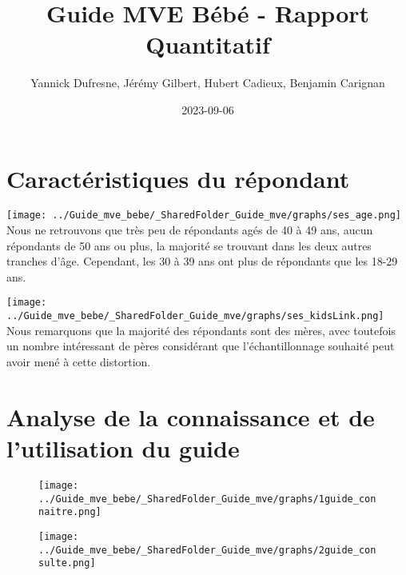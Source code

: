 \documentclass[
]{article}
\title{Guide MVE Bébé - Rapport Quantitatif}
\author{Yannick Dufresne, Jérémy Gilbert, Hubert Cadieux, Benjamin
Carignan}
\date{2023-09-06}
\begin{document}
\maketitle

\newpage

\hypertarget{caractuxe9ristiques-du-ruxe9pondant}{%
\section{Caractéristiques du
répondant}\label{caractuxe9ristiques-du-ruxe9pondant}}

\texttt{[image: ../Guide\_mve\_bebe/\_SharedFolder\_Guide\_mve/graphs/ses\_age.png]}
\newline Nous ne retrouvons que très peu de répondants agés de 40 à 49
ans, aucun répondants de 50 ans ou plus, la majorité se trouvant dans
les deux autres tranches d'âge. Cependant, les 30 à 39 ans ont plus de
répondants que les 18-29 ans.

\texttt{[image: ../Guide\_mve\_bebe/\_SharedFolder\_Guide\_mve/graphs/ses\_kidsLink.png]}
\newline Nous remarquons que la majorité des répondants sont des mères,
avec toutefois un nombre intéressant de pères considérant que
l'échantillonnage souhaité peut avoir mené à cette distortion.

\newpage

\hypertarget{analyse-de-la-connaissance-et-de-lutilisation-du-guide}{%
\section{Analyse de la connaissance et de l'utilisation du
guide}\label{analyse-de-la-connaissance-et-de-lutilisation-du-guide}}

\begin{figure}[htbp]
  \centering
  \begin{minipage}{0.5\textwidth}
    \texttt{[image: ../Guide\_mve\_bebe/\_SharedFolder\_Guide\_mve/graphs/1guide\_connaitre.png]}
  \end{minipage}%
  \begin{minipage}{0.5\textwidth}
    \texttt{[image: ../Guide\_mve\_bebe/\_SharedFolder\_Guide\_mve/graphs/2guide\_consulte.png]}
  \end{minipage}
\end{figure}

\vspace{10pt}
\end{document}
